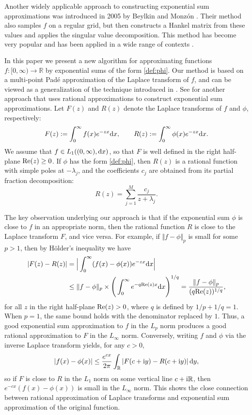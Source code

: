 \documentclass[12pt]{article}
\def\re{\textnormal {Re}}
\def\r{{\mathbb R}}
\def\d{{\textnormal d}}
\def\i{{\textnormal i}}
\begin{document}
Another widely applicable approach to constructing exponential sum approximations was introduced in 2005 by Beylkin and Monz\'on \cite{Beylkin_2005,Beylkin_2010}. Their method also samples $f$ on a regular grid, but then constructs a Hankel matrix from these values and applies the singular value decomposition. This method has become very popular and has been applied in a wide range of contexts \cite{Feng_2017,Iscoe_2010,McLean_2018}.


In this paper we present a new algorithm for approximating functions $f : [0,\infty) \to \r$ by exponential sums of the form \eqref{def:phi}. Our method is based on a multi-point Padé approximation of the Laplace transform of $f$, and can be viewed as a generalization of the technique introduced in \cite{Kuznetsov_2022}. See 
\cite{DereviankoPlonkaPetz2023} for another approach that uses rational approximations to construct exponential sum approximations. Let $F(z)$ and $R(z)$ denote the Laplace transforms of $f$ and $\phi$, respectively:
\begin{equation}\label{def:F_Laplace_transform}
F(z):=\int_0^{\infty} f(x) e^{-zx} \d x, \qquad
R(z):=\int_0^{\infty} \phi(x) e^{-z x} \d x.
\end{equation}
We assume that $f \in L_1((0,\infty), \d x)$, so that $F$ is well defined in the right half-plane $\re(z) \ge 0$.
If $\phi$ has the form \eqref{def:phi}, then $R(z)$ is a rational function with simple poles at $-\lambda_j$, and the coefficients $c_j$ are obtained from its partial fraction decomposition:
\begin{equation}\label{eqn:Phi_partial_fraction}
R(z)=\sum_{j=1}^M \frac{c_j}{z+\lambda_j}.
\end{equation}

The key observation underlying our approach is that if the exponential sum $\phi$ is close  to $f$ in an appropriate norm, then the rational function $R$ is close  to the Laplace transform $F$, and vice versa. For example, if $\Vert f - \phi \Vert_p$ is small for some $p>1$, then by Hölder’s inequality we have
\begin{align*}
|F(z)-R(z)| &= \Big \vert \int_0^{\infty} (f(x)-\phi(x)) e^{-z x}   \d x \Big \vert \\
&\le \Vert f-\phi \Vert_p \times \Bigg(\int_0^{\infty} e^{-q \re(z) x}  \d x \Bigg)^{1/q}
= \frac{\Vert f-\phi \Vert_p}{(q \re(z))^{1/q}},
\end{align*}
for all $z$ in the right half-plane $\re(z) > 0$, where $q$ is defined by $1/p+1/q=1$. When $p=1$, the same bound holds with the denominator replaced by $1$. Thus, a good exponential sum approximation to $f$ in the $L_p$ norm produces a good rational approximation to $F$ in the $L_{\infty}$ norm. Conversely, writing $f$ and $\phi$ via the inverse Laplace transform yields, for any $c>0$,
$$
|f(x) - \phi(x)| \le \frac{e^{c x}}{2 \pi} \int_{\r} |F(c+\i y) - R(c+\i y)| \, \d y,
$$
so if $F$ is close to $R$ in the $L_1$ norm on some vertical line $c+ \i \r$, then $e^{-c x}(f(x)-\phi(x))$ is small in the $L_{\infty}$ norm. This shows the close connection between rational approximation of Laplace transforms and exponential sum approximation of the original function.
\end{document}
